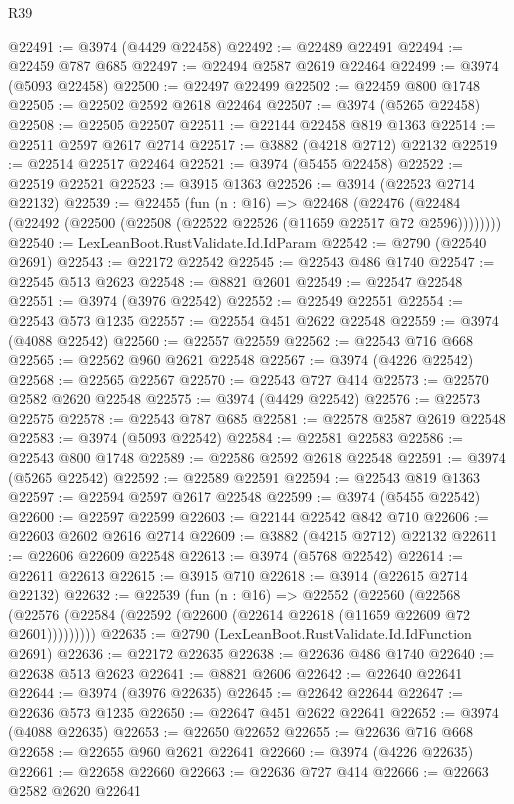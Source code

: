 \begin{lexlean}{R39}
\begin{coremodule}
@22491 := @3974 (@4429 @22458)
@22492 := @22489 @22491
@22494 := @22459 @787 @685
@22497 := @22494 @2587 @2619 @22464
@22499 := @3974 (@5093 @22458)
@22500 := @22497 @22499
@22502 := @22459 @800 @1748
@22505 := @22502 @2592 @2618 @22464
@22507 := @3974 (@5265 @22458)
@22508 := @22505 @22507
@22511 := @22144 @22458 @819 @1363
@22514 := @22511 @2597 @2617 @2714
@22517 := @3882 (@4218 @2712) @22132
@22519 := @22514 @22517 @22464
@22521 := @3974 (@5455 @22458)
@22522 := @22519 @22521
@22523 := @3915 @1363
@22526 := @3914 (@22523 @2714 @22132)
@22539 := @22455
    (fun (n : @16) =>
    @22468 (@22476 (@22484 (@22492 (@22500 (@22508 (@22522 @22526 (@11659 @22517 @72 @2596))))))))
@22540 := LexLeanBoot.RustValidate.Id.IdParam
@22542 := @2790 (@22540 @2691)
@22543 := @22172 @22542
@22545 := @22543 @486 @1740
@22547 := @22545 @513 @2623
@22548 := @8821 @2601
@22549 := @22547 @22548
@22551 := @3974 (@3976 @22542)
@22552 := @22549 @22551
@22554 := @22543 @573 @1235
@22557 := @22554 @451 @2622 @22548
@22559 := @3974 (@4088 @22542)
@22560 := @22557 @22559
@22562 := @22543 @716 @668
@22565 := @22562 @960 @2621 @22548
@22567 := @3974 (@4226 @22542)
@22568 := @22565 @22567
@22570 := @22543 @727 @414
@22573 := @22570 @2582 @2620 @22548
@22575 := @3974 (@4429 @22542)
@22576 := @22573 @22575
@22578 := @22543 @787 @685
@22581 := @22578 @2587 @2619 @22548
@22583 := @3974 (@5093 @22542)
@22584 := @22581 @22583
@22586 := @22543 @800 @1748
@22589 := @22586 @2592 @2618 @22548
@22591 := @3974 (@5265 @22542)
@22592 := @22589 @22591
@22594 := @22543 @819 @1363
@22597 := @22594 @2597 @2617 @22548
@22599 := @3974 (@5455 @22542)
@22600 := @22597 @22599
@22603 := @22144 @22542 @842 @710
@22606 := @22603 @2602 @2616 @2714
@22609 := @3882 (@4215 @2712) @22132
@22611 := @22606 @22609 @22548
@22613 := @3974 (@5768 @22542)
@22614 := @22611 @22613
@22615 := @3915 @710
@22618 := @3914 (@22615 @2714 @22132)
@22632 := @22539
    (fun (n : @16) =>
    @22552
      (@22560
        (@22568 (@22576 (@22584 (@22592 (@22600 (@22614 @22618 (@11659 @22609 @72 @2601)))))))))
@22635 := @2790 (LexLeanBoot.RustValidate.Id.IdFunction @2691)
@22636 := @22172 @22635
@22638 := @22636 @486 @1740
@22640 := @22638 @513 @2623
@22641 := @8821 @2606
@22642 := @22640 @22641
@22644 := @3974 (@3976 @22635)
@22645 := @22642 @22644
@22647 := @22636 @573 @1235
@22650 := @22647 @451 @2622 @22641
@22652 := @3974 (@4088 @22635)
@22653 := @22650 @22652
@22655 := @22636 @716 @668
@22658 := @22655 @960 @2621 @22641
@22660 := @3974 (@4226 @22635)
@22661 := @22658 @22660
@22663 := @22636 @727 @414
@22666 := @22663 @2582 @2620 @22641

\end{coremodule}
\end{lexlean}
